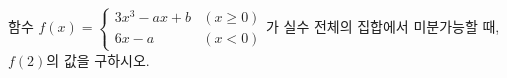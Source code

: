 함수 $f(x)=\begin{cases} 3x^3-ax+b & (x\ge 0) \\ 6x-a & (x<0) \end{cases}$가 실수 전체의 집합에서 미분가능할 때, $f(2)$의 값을 구하시오. 
